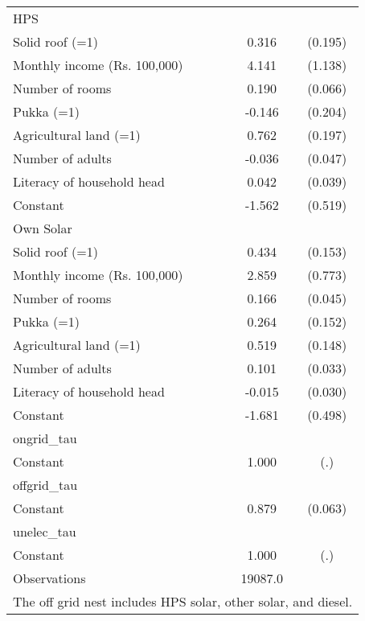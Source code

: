 \begin{table}[htbp]
{\begin{tabular}{l*{1}{cc}}
\midrule
HPS                   &                     &            \\
Solid roof (=1)     &       0.316         &     (0.195)\\
Monthly income (Rs. 100,000)&       4.141\sym{***}&     (1.138)\\
Number of rooms     &       0.190\sym{***}&     (0.066)\\
Pukka (=1)          &      -0.146         &     (0.204)\\
Agricultural land (=1)&       0.762\sym{***}&     (0.197)\\
Number of adults    &      -0.036         &     (0.047)\\
Literacy of household head&       0.042         &     (0.039)\\
Constant            &      -1.562\sym{***}&     (0.519)\\
\midrule
Own Solar                  &                     &            \\
Solid roof (=1)     &       0.434\sym{***}&     (0.153)\\
Monthly income (Rs. 100,000)&       2.859\sym{***}&     (0.773)\\
Number of rooms     &       0.166\sym{***}&     (0.045)\\
Pukka (=1)          &       0.264\sym{*}  &     (0.152)\\
Agricultural land (=1)&       0.519\sym{***}&     (0.148)\\
Number of adults    &       0.101\sym{***}&     (0.033)\\
Literacy of household head&      -0.015         &     (0.030)\\
Constant            &      -1.681\sym{***}&     (0.498)\\
\midrule
ongrid\_tau          &                     &            \\
Constant            &       1.000         &         (.)\\
\midrule
offgrid\_tau         &                     &            \\
Constant            &       0.879\sym{***}&     (0.063)\\
\midrule
unelec\_tau          &                     &            \\
Constant            &       1.000         &         (.)\\
\midrule
Observations        &     19087.0         &            \\
\bottomrule
\multicolumn{3}{l}{\footnotesize The off grid nest includes HPS solar, other solar, and diesel.}\\
\end{tabular}}
\end{table}
